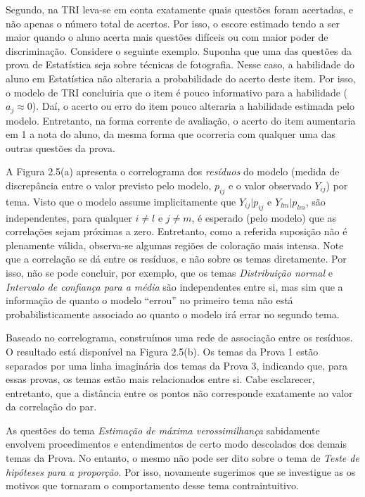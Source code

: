 \documentclass[a4paper]{report}
\begin{document}
Segundo, na TRI leva-se em conta exatamente quais questões foram
acertadas, e não apenas o número total de acertos. Por isso, o escore
estimado tendo a ser maior quando o aluno acerta mais questões difíceis
ou com maior poder de discriminação. Considere o seguinte exemplo.
Suponha que uma das questões da prova de Estatística seja sobre técnicas
de fotografia. Nesse caso, a habilidade do aluno em Estatística não
alteraria a probabilidade do acerto deste item. Por isso, o modelo de
TRI concluiria que o item é pouco informativo para a habilidade
(\(a_j \approx 0\)). Daí, o acerto ou erro do item pouco alteraria a
habilidade estimada pelo modelo. Entretanto, na forma corrente de
avaliação, o acerto do item aumentaria em 1 a nota do aluno, da mesma
forma que ocorreria com qualquer uma das outras questões da prova.

A Figura 2.5(a) apresenta o correlograma dos \emph{resíduos} do modelo
(medida de discrepância entre o valor previsto pelo modelo, \(p_{ij}\) e
o valor observado \(Y_{ij}\)) por tema. Visto que o modelo assume
implicitamente que \(Y_{ij}|p_{ij}\) e \(Y_{lm}|p_{lm}\), são
independentes, para qualquer \(i \neq l\) e \(j \neq m\), é esperado
(pelo modelo) que as correlações sejam próximas a zero. Entretanto, como
a referida suposição não é plenamente válida, observa-se algumas regiões
de coloração mais intensa. Note que a correlação se dá entre os
resíduos, e não sobre os temas diretamente. Por isso, não se pode
concluir, por exemplo, que os temas \emph{Distribuição normal} e
\emph{Intervalo de confiança para a média} são independentes entre si,
mas sim que a informação de quanto o modelo ``errou'' no primeiro tema
não está probabilisticamente associado ao quanto o modelo irá errar no
segundo tema.

Baseado no correlograma, construímos uma rede de associação entre os
resíduos. O resultado está disponível na Figura 2.5(b). Os temas da
Prova 1 estão separados por uma linha imaginária dos temas da Prova 3,
indicando que, para essas provas, os temas estão mais relacionados entre
si. Cabe esclarecer, entretanto, que a distância entre os pontos não
corresponde exatamente ao valor da correlação do par.

As questões do tema \emph{Estimação de máxima verossimilhança}
sabidamente envolvem procedimentos e entendimentos de certo modo
descolados dos demais temas da Prova. No entanto, o mesmo não pode ser
dito sobre o tema de \emph{Teste de hipóteses para a proporção}. Por
isso, novamente sugerimos que se investigue as os motivos que tornaram o
comportamento desse tema contraintuitivo.
\end{document}
